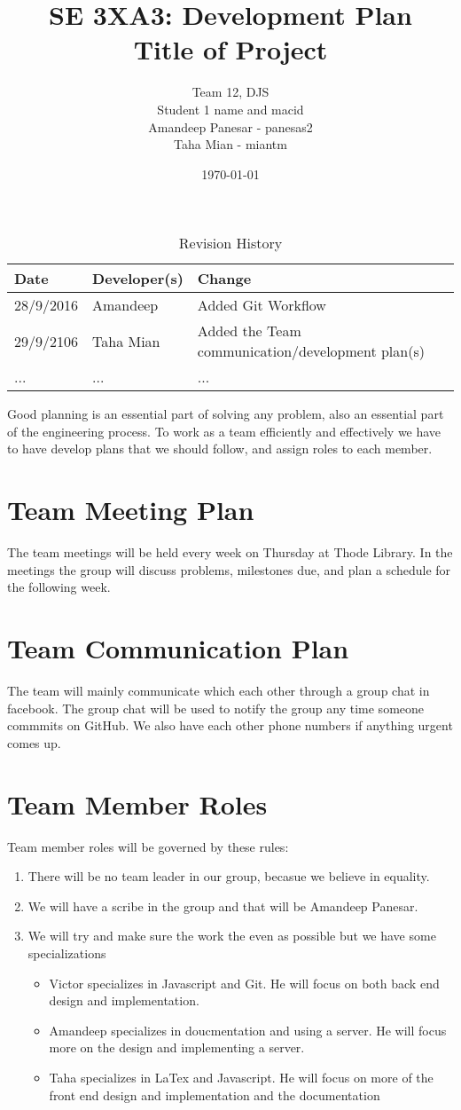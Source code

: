 \documentclass{article}
\title{SE 3XA3: Development Plan\\Title of Project}
\author{Team 12, DJS
		\\ Student 1 name and macid
		\\ Amandeep Panesar - panesas2
		\\ Taha Mian - miantm
}
\date{\today}
\begin{document}
\begin{table}[hp]
\caption{Revision History} \label{TblRevisionHistory}
\begin{tabularx}{\textwidth}{llX}
\toprule
\textbf{Date} & \textbf{Developer(s)} & \textbf{Change}\\
\midrule
28/9/2016 & Amandeep & Added Git Workflow\\
29/9/2106 & Taha Mian & Added the Team communication/development plan(s)\\
... & ... & ...\\
\bottomrule
\end{tabularx}
\end{table}

\newpage

\maketitle

Good planning is an essential part of solving any problem, also an essential part of the engineering process. To work as a team efficiently and effectively we have to have develop plans that we should follow, and assign roles to each member.

\section{Team Meeting Plan}
The team meetings will be held every week on Thursday at Thode Library. In the meetings the group will discuss problems, milestones due, and plan a schedule for the following week.
\section{Team Communication Plan}
The team will mainly communicate which each other through a group chat in facebook. The group chat will be used to notify the group any time someone commmits on GitHub. We also have each other phone numbers if anything urgent comes up.
\section{Team Member Roles}
Team member roles will be governed by these rules:
\begin{enumerate}
\item There will be no team leader in our group, becasue we believe in equality.
\item We will have a scribe in the group and that will be Amandeep Panesar.
\item We will try and make sure the work the even as possible but we have some specializations
\begin{itemize}
\item Victor specializes in Javascript and Git. He will focus on both back end design and implementation.
\item Amandeep specializes in doucmentation and using a server. He will focus more on the design and implementing a server.
\item Taha specializes in LaTex and Javascript. He will focus on more of the front end design and implementation and the documentation
\end{itemize}
\end{enumerate}
\end{document}
